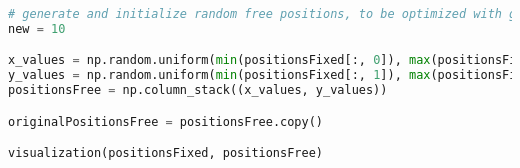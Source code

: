 \begin{lstlisting}[language=Python, style=jupycolors]
# generate and initialize random free positions, to be optimized with gradient descent
new = 10

x_values = np.random.uniform(min(positionsFixed[:, 0]), max(positionsFixed[:, 0]), new)
y_values = np.random.uniform(min(positionsFixed[:, 1]), max(positionsFixed[:, 1]), new)
positionsFree = np.column_stack((x_values, y_values))

originalPositionsFree = positionsFree.copy()

visualization(positionsFixed, positionsFree)
\end{lstlisting}